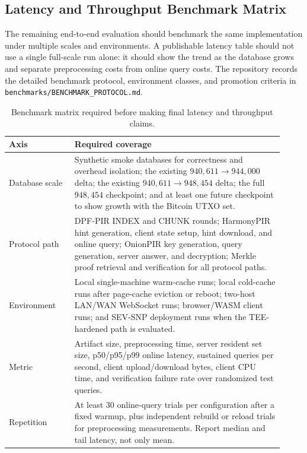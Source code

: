 \subsection{Latency and Throughput Benchmark Matrix}

The remaining end-to-end evaluation should benchmark the same implementation under multiple scales and environments. A publishable latency table should not use a single full-scale run alone: it should show the trend as the database grows and separate preprocessing costs from online query costs. The repository records the detailed benchmark protocol, environment classes, and promotion criteria in \texttt{benchmarks/BENCHMARK\_PROTOCOL.md}.

\begin{table}[ht]
\centering
\small
\begin{tabular}{p{0.22\linewidth}p{0.70\linewidth}}
\hline
Axis & Required coverage \\
\hline
Database scale & Synthetic smoke databases for correctness and overhead isolation; the existing $940{,}611 \to 944{,}000$ delta; the existing $940{,}611 \to 948{,}454$ delta; the full $948{,}454$ checkpoint; and at least one future checkpoint to show growth with the Bitcoin UTXO set. \\
Protocol path & DPF-PIR INDEX and CHUNK rounds; HarmonyPIR hint generation, client state setup, hint download, and online query; OnionPIR key generation, query generation, server answer, and decryption; Merkle proof retrieval and verification for all protocol paths. \\
Environment & Local single-machine warm-cache runs; local cold-cache runs after page-cache eviction or reboot; two-host LAN/WAN WebSocket runs; browser/WASM client runs; and SEV-SNP deployment runs when the TEE-hardened path is evaluated. \\
Metric & Artifact size, preprocessing time, server resident set size, p50/p95/p99 online latency, sustained queries per second, client upload/download bytes, client CPU time, and verification failure rate over randomized test queries. \\
Repetition & At least 30 online-query trials per configuration after a fixed warmup, plus independent rebuild or reload trials for preprocessing measurements. Report median and tail latency, not only mean. \\
\hline
\end{tabular}
\caption{Benchmark matrix required before making final latency and throughput claims.}
\label{tab:benchmark-matrix}
\end{table}

